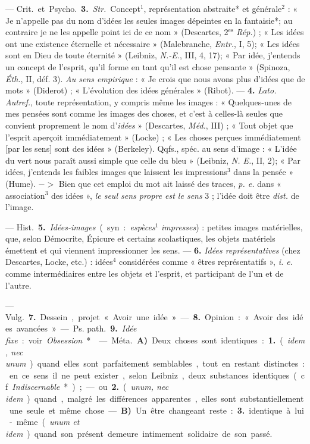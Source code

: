 \begin{itemize}[leftmargin=1cm, label=, itemsep=1pt]
— \si{Crit.} et \si{Psycho.} {\bf 3.} {\it Str.} Concept$^1$, représentation
abstraite* et générale$^2$ : « Je n’appelle pas du nom d’idées les seules
images dépeintes en la fantaisie*; au contraire je ne les appelle point ici
de ce nom » (Descartes, 2$^\text{es}$ {\it Rép.}) ; « Les idées ont une
existence éternelle et nécessaire » (Malebranche, {\it Entr.}, I, 5); « Les
idées sont en Dieu de toute éternité » (Leibniz, {\it N.-E.}, III, 4, 17);
« Par {\it }idée, j'entends un concept de
l'esprit, qu'il forme en tant qu'il est chose pensante » (Spinoza, {\it
Éth.}, II, déf. 3). {\it Au sens empirique} : « Je crois que nous avons plus
d'idées que de mots » (Diderot) ; « L’évolution des idées
générales » (Ribot). —  {\bf 4.} {\it Lato.} {\it Autref.}, toute
représentation, y compris même les images : « Quelques-unes de mes pensées
sont comme les images des choses, et c’est à celles-là seules que convient
proprement le nom d'{\it idées} » (Descartes, {\it Méd.}, III) ; « Tout
objet que l'esprit aperçoit immédiatement » (Locke) ; « Les choses perçues
immédiatement [par les sens] sont des idées » (Berkeley). Qqfs., spéc. au
sens d'image : « L'idée du vert nous paraît aussi simple que celle du
bleu » (Leibniz, {\it N. E.}, II, 2); « Par idées, j'entends les faibles
images que laissent les impressions$^3$ dans la pensée » (Hume). $->$ Bien
que cet emploi du mot ait laissé des traces, {\it p. e.} dans
« association$^3$ des idées », {\it le seul sens propre est le sens} 3 ;
l'idée doit être {\it dist.} de l’image.

— \si{Hist.} {\bf 5.} {\it Idées-images} (syn. : {\it espèces}$^1$
{\it impresses}) : petites images matérielles, que, selon Démocrite, Épicure
et certains scolastiques, les objets matériels émettent et qui viennent
impressionner les sens. — {\bf 6.} {\it Idées représentatives} (chez
Descartes, Locke, etc.) : idées$^4$ considérées comme « êtres
représentatifs », {\it i. e.} comme intermédiaires entre les objets et
l’esprit, et participant de l’un et de l’autre.

— \si{Vulg.} {\bf 7.} Dessein, projet « Avoir une idée ». — {\bf 8.}
Opinion : « Avoir des idées avancées ».

— \si{Ps. path.} {\bf 9.} {\it Idée fixe} : voir {\it Obsession}*.

 — \si{Méta.} {\bf A)} Deux choses sont identiques : {\bf 1.}
({\it idem, nec unum}) quand elles sont parfaitement semblables, tout en
restant distinctes : en ce sens il ne peut exister, selon Leibniz, deux
substances identiques (cf. {\it Indiscernable}*) ; — ou {\bf 2.} ({\it unum,
nec idem}) quand, malgré les différences apparentes, elles sont
substantiellement une seule et même chose. — {\bf B)} Un être changeant
reste : {\bf 3.} identique à lui-même ({\it unum et idem}) quand son présent
demeure intimement solidaire de son passé.


\end{itemize}
